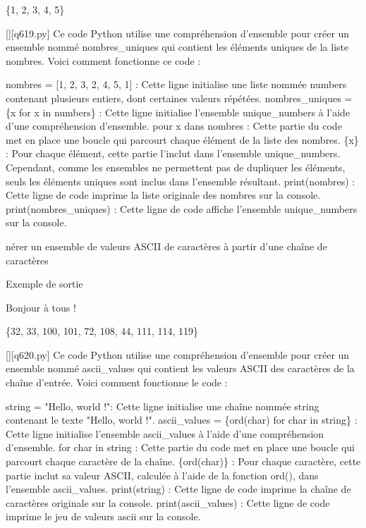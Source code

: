 \{1, 2, 3, 4, 5\}
        \par
        \begin{solution}
            \renewcommand{\nomfichier}{q619.py}
            \pythonfile{\chemincode \nomfichier}[][\nomfichier]
            Ce code Python utilise une compréhension d'ensemble pour créer un ensemble nommé nombres\_uniques qui contient les éléments uniques de la liste nombres. Voici comment fonctionne ce code :

    nombres = [1, 2, 3, 2, 4, 5, 1] : Cette ligne initialise une liste nommée numbers contenant plusieurs entiers, dont certaines valeurs répétées.
    nombres\_uniques = \{x for x in numbers\} : Cette ligne initialise l'ensemble unique\_numbers à l'aide d'une compréhension d'ensemble.
        pour x dans nombres : Cette partie du code met en place une boucle qui parcourt chaque élément de la liste des nombres.
        \{x\} : Pour chaque élément, cette partie l'inclut dans l'ensemble unique\_numbers. Cependant, comme les ensembles ne permettent pas de dupliquer les éléments, seuls les éléments uniques sont inclus dans l'ensemble résultant.
    print(nombres) : Cette ligne de code imprime la liste originale des nombres sur la console.
    print(nombres\_uniques) : Cette ligne de code affiche l'ensemble unique\_numbers sur la console.
        \end{solution}
        

        \question
        nérer un ensemble de valeurs ASCII de caractères à partir d'une chaîne de caractères

Exemple de sortie

Bonjour à tous !

\{32, 33, 100, 101, 72, 108, 44, 111, 114, 119\}
        \par
        \begin{solution}
            \renewcommand{\nomfichier}{q620.py}
            \pythonfile{\chemincode \nomfichier}[][\nomfichier]
            Ce code Python utilise une compréhension d'ensemble pour créer un ensemble nommé ascii\_values qui contient les valeurs ASCII des caractères de la chaîne d'entrée. Voici comment fonctionne le code :

    string = "Hello, world !": Cette ligne initialise une chaîne nommée string contenant le texte "Hello, world !".
    ascii\_values = \{ord(char) for char in string\} : Cette ligne initialise l'ensemble ascii\_values à l'aide d'une compréhension d'ensemble.
        for char in string : Cette partie du code met en place une boucle qui parcourt chaque caractère de la chaîne.
        \{ord(char)\} : Pour chaque caractère, cette partie inclut sa valeur ASCII, calculée à l'aide de la fonction ord(), dans l'ensemble ascii\_values.
    print(string) : Cette ligne de code imprime la chaîne de caractères originale sur la console.
    print(ascii\_values) : Cette ligne de code imprime le jeu de valeurs ascii sur la console.
        \end{solution}
        


